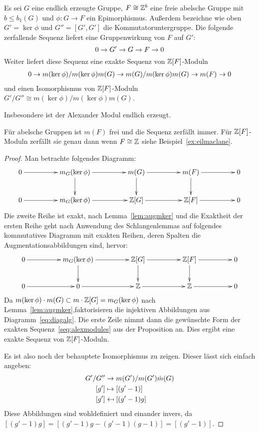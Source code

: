 \begin{prop}
\label{prop:alexmodules}
	Es sei $G$ eine endlich erzeugte Gruppe, $F \cong \mathbb{Z}^b$ eine freie abelsche Gruppe mit $b\leq b_1(G)$ und $\phi: G \to F$ ein Epimorphismus. Außerdem bezeichne wie oben $G'=\ker\phi$ und $G''=[G',G']$ die Kommutatoruntergruppe. Die folgende zerfallende Sequenz liefert eine Gruppenwirkung von $F$ auf $G'$:
	\[
		0\to G'\to G\to F\to0
	\]
	Weiter liefert diese Sequenz eine exakte Sequenz von $\mathbb{Z}[F]$-Moduln
		\begin{align}
		0\to m(\ker\phi)/m(\ker\phi)m(G)\to m(G)/m(\ker\phi)m(G)\to m(F)\to0 \label{seq:alexmodules}
		\end{align}
		und einen Isomorphismus von $\mathbb{Z}[F]$-Moduln $G'/G'' \cong m(\ker\phi)/m(\ker\phi)m(G)$.

	Insbesondere ist der Alexander Modul endlich erzeugt.
\end{prop}
\begin{bem}
	Für abelsche Gruppen ist $m(F)$ frei und die Sequenz zerfällt immer. Für $\mathbb{Z}[F]$-Moduln zerfällt sie genau dann wenn $F\cong \mathbb{Z}$ siehe Beispiel~\ref{ex:eilmaclane}.
\end{bem}
\begin{proof}
		Man betrachte folgendes Diagramm:
		\begin{equation}
		\label{eq:diagalg}
			\begin{xy}
				\xymatrixcolsep{4pc}\xymatrix{	0 \ar[r]&	m_G(\ker\phi) \ar[r] \ar[d]&	m(G) \ar[r] \ar[d]& m(F) \ar[r] \ar[d]&	0\\
							0 \ar[r]&	m_G(\ker\phi)	\ar[r] 		&	\ZZ[G] \ar[r]	&	\ZZ[F] \ar[r] &		0}
			\end{xy}			
		\end{equation}
		Die zweite Reihe ist exakt, nach Lemma~\ref{lem:augmker} und die Exaktheit der ersten Reihe geht nach Anwendung des Schlangenlemmas auf folgendes kommutatives Diagramm mit exakten Reihen, deren Spalten die Augmentationsabbildungen sind, hervor:
		\[
			\xymatrixcolsep{4pc}\begin{xy}
				\xymatrix{	0 \ar[r]&	m_G(\ker\phi) \ar[r] \ar[d]&	\ZZ[G] \ar[r] \ar[d]& \ZZ[F] \ar[r] \ar[d]&	0\\
							0 \ar[r]&		0		\ar[r] 		&	\ZZ \ar[r]	&	\ZZ \ar[r] &		0}
			\end{xy}
		\]
		Da $m(\ker\phi)\cdot m(G) \subset m \cdot \mathbb{Z}[G] = m_G(\ker\phi)$ nach Lemma~\ref{lem:augmker},faktorisieren die injektiven Abbildungen aus Diagramm~\ref{eq:diagalg}. Die erste Zeile nimmt dann die gewünschte Form der exakten Sequenz~\eqref{seq:alexmodules} aus der Proposition an. Dies ergibt eine exakte Sequenz von $\mathbb{Z}[F]$-Moduln.

		Es ist also noch der behauptete Isomorphismus zu zeigen. Dieser lässt sich einfach angeben:
		\begin{align*}
			G'/G'' 	&\to 		m(G')/m(G')\dot m(G)\\
			[g']		&\mapsto	[(g'-1)]\\
			[g']		&\mathrel{\reflectbox{\ensuremath{\mapsto}}}  [(g'-1)g]
		\end{align*}
		Diese Abbildungen sind wohldefiniert und einander invers, da $[(g'-1)g]=[(g'-1)g-(g'-1)(g-1)]=[(g'-1)]$.
	\end{proof}	
	
